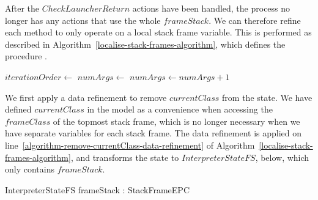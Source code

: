 After the $CheckLauncherReturn$ actions have been handled, the process
no longer has any actions that use the whole $frameStack$.
We can therefore refine each method to only operate on a local stack
frame variable.
This is performed as described in
Algorithm~\ref{localise-stack-frames-algorithm}, which defines the
procedure .

\begin{algorithm}[t]
  \begin{algorithmic}[1]
    \arraycolsep=0cm
    \State {}
    \label{algorithm-remove-currentClass-data-refinement}
    \State $iterationOrder \gets$ 
    \label{algorithm-method-dependency-order-call}
    \label{algorithm-localise-stack-frames-loop}
    \State $numArgs \gets$ 
    \label{algorithm-static-args-check-start}
    \State $numArgs \gets numArgs + 1$
    \EndIf
    \label{algorithm-static-args-check-end}
    \State {}
    \label{algorithm-arguments-introduction}
    \State {}
    \label{algorithm-redefine-method-action-to-include-parameters}
    \State {}
    \label{algorithm-HandleReturnEPC-stackFrame-introduction-rule}
    \EndFor
  \end{algorithmic}
  \caption{}
  \label{localise-stack-frames-algorithm}
\end{algorithm}
 
We first apply a data refinement to remove $currentClass$ from the
state.
We have defined $currentClass$ in the model as a convenience when
accessing the $frameClass$ of the topmost stack frame, which is no
longer necessary when we have separate variables for each stack frame.
The data refinement is applied on
line~\ref{algorithm-remove-currentClass-data-refinement} of
Algorithm~\ref{localise-stack-frames-algorithm}, and transforms the
state to $InterpreterStateFS$, below, which only contains
$frameStack$.
\begin{schema}{InterpreterStateFS}
  frameStack : \seq StackFrameEPC
\end{schema}

